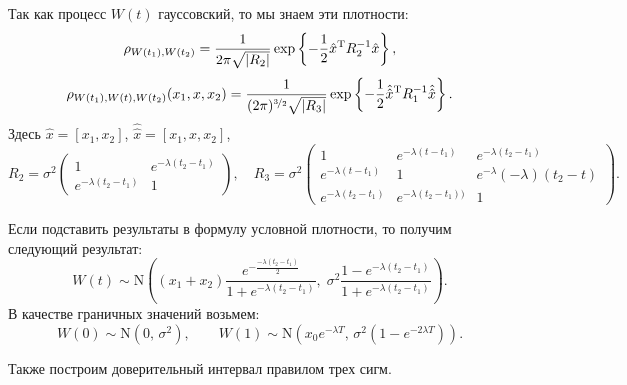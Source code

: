 Так как процесс $W(t)$ гауссовский, то мы знаем эти плотности:
$$
        \rho_{W(t_1), W(t_2)}
=
        \frac {1}{
2\pi \sqrt{|R_2|}
        }
        \exp\left\{
-\frac12 \hat x^{\mathrm{T}} R_2^{-1} \hat x
        \right\},
$$
$$
        \rho_{W(t_1), W(t), W(t_2)}
        (x_1, x, x_2)
=
        \frac1{
(2\pi)^{\nicefrac32} \sqrt{|R_3|}
        }
        \exp\left\{
-\frac12 \hat{\hat x}^{\mathrm{T}} R_1^{-1}\hat{\hat x}
        \right\}.
$$
Здесь $\hat x = [x_1, x_2]$, $\hat{\hat x} = [x_1, x, x_2]$,
$$
        R_2
=
        \sigma^2
        \begin{pmatrix}
1 & e^{-\lambda (t_2 - t_1)} \\
e^{-\lambda (t_2 - t_1)} & 1
        \end{pmatrix},
\quad
        R_3
=
        \sigma^2
        \begin{pmatrix}
1 &
e^{-\lambda (t - t_1)} &
e^{-\lambda (t_2 - t_1)} \\
e^{-\lambda (t - t_1)} &
1 &
e^{-\lambda} (-\lambda) (t_2 - t) \\
e^{-\lambda (t_2 - t_1)} &
e^{-\lambda (t_2 - t_1))} &
1
        \end{pmatrix}.
$$

Если подставить результаты в формулу условной плотности, то получим следующий результат:
$$
        W(t)
\sim
        \mathrm{N}\left(
(x_1 + x_2)
\frac{
        e^{
-\frac{
        -\lambda (t_2 - t_1)
}{
2
}
        }
}{
        1 + e^{
-\lambda (t_2 - t_1)
        }
}
        ,\;
\sigma^2 \frac{
        1 - e^{
-\lambda(t_2 - t_1)
        }
}{
        1 + e^{
-\lambda(t_2 - t_1)
        }
}
        \right).
$$
В качестве граничных значений возьмем:
$$
        W(0)\sim \mathrm{N}(0,\,\sigma^2),
\qquad
        W(1) \sim \mathrm{N}\left(x_0 e^{-\lambda T},\,\sigma^2\left( 1 - e^{-2\lambda T}\right)\right).
$$
\begin{remark}
        Также построим доверительный интервал правилом трех сигм.
\end{remark}


